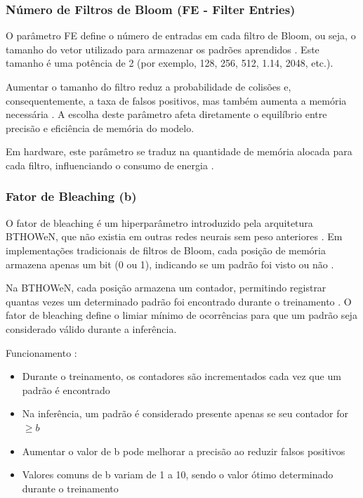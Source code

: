 \documentclass{article}
\begin{document}
\subsubsection{Número de Filtros de Bloom (FE - Filter Entries)}

O parâmetro FE define o número de entradas em cada filtro de Bloom, ou seja, o tamanho do vetor utilizado para armazenar os padrões aprendidos \cite{santiago2020}. Este tamanho é uma potência de 2 (por exemplo, 128, 256, 512, 1.14, 2048, etc.).

Aumentar o tamanho do filtro reduz a probabilidade de colisões e, consequentemente, a taxa de falsos positivos, mas também aumenta a memória necessária \cite{santiago2020, susskind2022}. A escolha deste parâmetro afeta diretamente o equilíbrio entre precisão e eficiência de memória do modelo.

Em hardware, este parâmetro se traduz na quantidade de memória alocada para cada filtro, influenciando o consumo de energia \cite{susskind2022}.

\subsubsection{Fator de Bleaching (b)}

O fator de bleaching é um hiperparâmetro introduzido pela arquitetura BTHOWeN, que não existia em outras redes neurais sem peso anteriores \cite{santiago2020}. Em implementações tradicionais de filtros de Bloom, cada posição de memória armazena apenas um bit (0 ou 1), indicando se um padrão foi visto ou não \cite{santiago2020, lusquino2020}. 

Na BTHOWeN, cada posição armazena um contador, permitindo registrar quantas vezes um determinado padrão foi encontrado durante o treinamento \cite{santiago2020}. O fator de bleaching define o limiar mínimo de ocorrências para que um padrão seja considerado válido durante a inferência.

Funcionamento \cite{santiago2020, susskind2022}:
\begin{itemize}
    \item Durante o treinamento, os contadores são incrementados cada vez que um padrão é encontrado
    \item Na inferência, um padrão é considerado presente apenas se seu contador for $\geq b$
    \item Aumentar o valor de b pode melhorar a precisão ao reduzir falsos positivos
    \item Valores comuns de b variam de 1 a 10, sendo o valor ótimo determinado durante o treinamento
\end{itemize}
\end{document}
